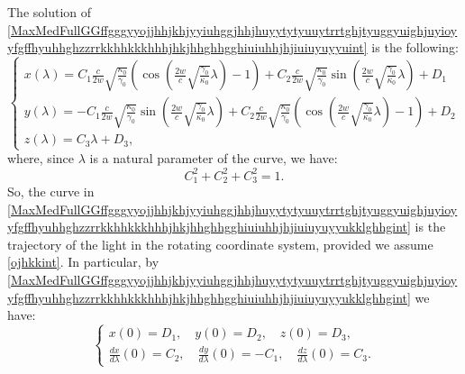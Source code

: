 \documentclass{article}
\theoremstyle{definition}
\theoremstyle{remark}
\newcommand{\er}{\eqref}
\newcommand{\er}{\eqref}
\begin{document}
%
%
%
The solution of
\er{MaxMedFullGGffgggyyojjhhjkhjyyiuhggjhhjhuyytytyuuytrrtghjtyuggyuighjuyioyyfgffhyuhhghzzrrkkhhkkkhhhjhkjhhghhgghiuiuhhjhjiuiuyuyyuint}
is the following:
\begin{equation}\label{MaxMedFullGGffgggyyojjhhjkhjyyiuhggjhhjhuyytytyuuytrrtghjtyuggyuighjuyioyyfgffhyuhhghzzrrkkhhkkkhhhjhkjhhghhgghiuiuhhjhjiuiuyuyyukklghhgint}
\begin{cases}
x(\lambda)=C_1\frac{c}{2w}\sqrt{\frac{\kappa_0}{\gamma_0}}\left(\cos{\left(\frac{2w}{c}\sqrt{\frac{\gamma_0}{\kappa_0}}\lambda\right)}-1\right)+C_2\frac{c}{2w}\sqrt{\frac{\kappa_0}{\gamma_0}}\sin{\left(\frac{2w}{c}\sqrt{\frac{\gamma_0}{\kappa_0}}\lambda\right)}+D_1
\\
y(\lambda)=-C_1\frac{c}{2w}\sqrt{\frac{\kappa_0}{\gamma_0}}\sin{\left(\frac{2w}{c}\sqrt{\frac{\gamma_0}{\kappa_0}}\lambda\right)}+C_2\frac{c}{2w}\sqrt{\frac{\kappa_0}{\gamma_0}}\left(\cos{\left(\frac{2w}{c}\sqrt{\frac{\gamma_0}{\kappa_0}}\lambda\right)}-1\right)+D_2
\\
z(\lambda)=C_3\lambda+D_3,
\end{cases}
\end{equation}
where, since $\lambda$ is a natural parameter of the curve, we have:
\begin{equation}\label{MaxMedFullGGffgggyyojjhhjkhjyyiuhggjhhjhuyytytyuuytrrtghjtyuggyuighjuyioyyfgffhyuhhghzzrrkkhhkkkhhhjhkjhhghhgghiuiuhhjhjiuiuyuyyuojkint}
C^2_1+C^2_2+C^2_3=1.
\end{equation}
So, the curve in
\er{MaxMedFullGGffgggyyojjhhjkhjyyiuhggjhhjhuyytytyuuytrrtghjtyuggyuighjuyioyyfgffhyuhhghzzrrkkhhkkkhhhjhkjhhghhgghiuiuhhjhjiuiuyuyyukklghhgint}
is the trajectory of the light in the rotating coordinate system,
provided we assume \er{ojhkkint}. In particular, by
\er{MaxMedFullGGffgggyyojjhhjkhjyyiuhggjhhjhuyytytyuuytrrtghjtyuggyuighjuyioyyfgffhyuhhghzzrrkkhhkkkhhhjhkjhhghhgghiuiuhhjhjiuiuyuyyukklghhgint}
we have:
\begin{equation}\label{MaxMedFullGGffgggyyojjhhjkhjyyiuhggjhhjhuyytytyuuytrrtghjtyuggyuighjuyioyyfgffhyuhhghzzrrkkhhkkkhhhjhkjhhghhgghiuiuhhjhjiuiuyuyyuojkjkkkhguggint}
\begin{cases}
x(0)=D_1,\quad y(0)=D_2,\quad z(0)=D_3,\\
\frac{dx}{d\lambda}(0)=C_2,\quad\frac{dy}{d\lambda}(0)=-C_1,\quad\frac{dz}{d\lambda}(0)=C_3.
\end{cases}
\end{equation}
\end{document}

